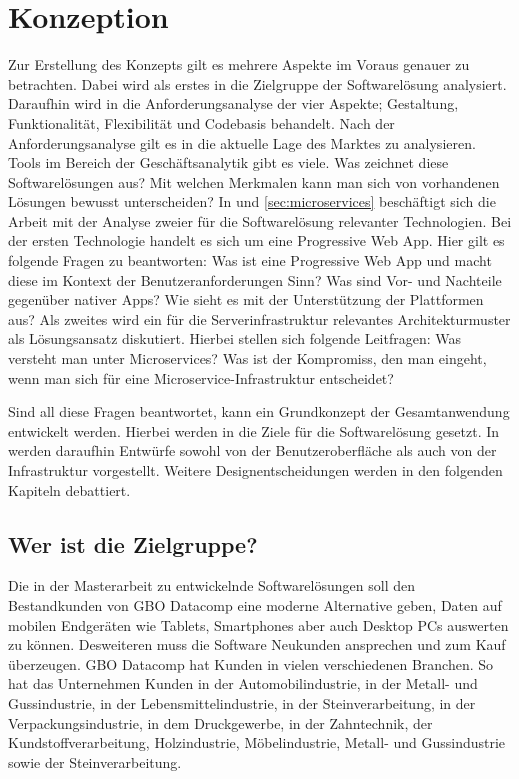 \chapter{Konzeption}
\label{chap:konzeption}

Zur Erstellung des Konzepts gilt es mehrere Aspekte im Voraus genauer zu betrachten.
Dabei wird als erstes in  die Zielgruppe der Softwarelösung analysiert. Daraufhin
wird in  die Anforderungsanalyse der vier Aspekte; Gestaltung, Funktionalität,
Flexibilität und Codebasis behandelt. Nach der Anforderungsanalyse gilt es
in  die aktuelle Lage
des Marktes zu analysieren. Tools im Bereich der Geschäftsanalytik gibt es viele. \cite{WikiBISoftware}
Was zeichnet diese Softwarelösungen aus? Mit welchen Merkmalen kann man sich von vorhandenen Lösungen
bewusst unterscheiden? In  und \ref{sec:microservices} beschäftigt
sich die Arbeit mit der Analyse zweier für die Softwarelösung relevanter Technologien.
Bei der ersten Technologie handelt es sich um eine Progressive Web App. Hier gilt es folgende
Fragen zu beantworten: Was ist eine Progressive Web App und macht diese 
im Kontext der Benutzeranforderungen Sinn? Was sind Vor- und Nachteile gegenüber nativer Apps?
Wie sieht es mit der Unterstützung der Plattformen aus? Als zweites wird ein für die
Serverinfrastruktur relevantes Architekturmuster als Lösungsansatz diskutiert. Hierbei
stellen sich folgende Leitfragen: Was versteht man unter Microservices? Was ist der Kompromiss,
den man eingeht, wenn man sich für eine Microservice-Infrastruktur entscheidet?

Sind all diese Fragen beantwortet, kann ein Grundkonzept der Gesamtanwendung entwickelt werden.
Hierbei werden in  die Ziele für die Softwarelösung gesetzt. In 
werden daraufhin Entwürfe sowohl von der Benutzeroberfläche als auch von der Infrastruktur vorgestellt.
Weitere Designentscheidungen werden in den folgenden Kapiteln debattiert.

\section{Wer ist die Zielgruppe?}
\label{sec:weristmeinezielgruppe}
Die in der Masterarbeit zu entwickelnde Softwarelösungen
soll den Bestandkunden von GBO Datacomp eine moderne Alternative geben, Daten 
auf mobilen Endgeräten wie Tablets, Smartphones aber auch Desktop PCs auswerten zu können.
Desweiteren muss die Software Neukunden ansprechen und zum Kauf überzeugen. GBO Datacomp
hat Kunden in vielen verschiedenen Branchen. So hat das Unternehmen Kunden in der
Automobilindustrie, in der Metall- und Gussindustrie, in der Lebensmittelindustrie,
in der Steinverarbeitung, in der Verpackungsindustrie, in dem Druckgewerbe, in der
Zahntechnik, der Kundstoffverarbeitung, Holzindustrie, Möbelindustrie, Metall- und Gussindustrie sowie
der Steinverarbeitung.\cite{GBODatacompBranchenloesungen}

